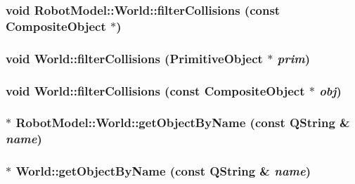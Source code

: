 \label{class_robot_model_1_1_world_aefae9b6b622f835aeca5c5bf82e1dfc7}
\hypertarget{class_robot_model_1_1_world_a3d99274678676e8b0d762f0d58fb6501}{
\subsubsection[{filterCollisions}]{\setlength{\rightskip}{0pt plus 5cm}void RobotModel::World::filterCollisions (const {\bf CompositeObject} $\ast$)}}
\label{class_robot_model_1_1_world_a3d99274678676e8b0d762f0d58fb6501}
\hypertarget{class_robot_model_1_1_world_a38aea4885454231131d4ccb7945138dc}{
\subsubsection[{filterCollisions}]{\setlength{\rightskip}{0pt plus 5cm}void World::filterCollisions ({\bf PrimitiveObject} $\ast$ {\em prim})}}
\label{class_robot_model_1_1_world_a38aea4885454231131d4ccb7945138dc}
\hypertarget{class_robot_model_1_1_world_a530cb18d1249f7c6e94c4ba6879cf36a}{
\subsubsection[{filterCollisions}]{\setlength{\rightskip}{0pt plus 5cm}void World::filterCollisions (const {\bf CompositeObject} $\ast$ {\em obj})}}
\label{class_robot_model_1_1_world_a530cb18d1249f7c6e94c4ba6879cf36a}
\hypertarget{class_robot_model_1_1_world_a98d1508fb89f4b4edb2ad0bee04f490e}{
\subsubsection[{getObjectByName}]{$\ast$ RobotModel::World::getObjectByName (const QString \& {\em name})}}
\label{class_robot_model_1_1_world_a98d1508fb89f4b4edb2ad0bee04f490e}
\hypertarget{class_robot_model_1_1_world_a2ccf0c4dd817ecae42edbb82f54289a2}{
\subsubsection[{getObjectByName}]{ $\ast$ World::getObjectByName (const QString \& {\em name})}}
